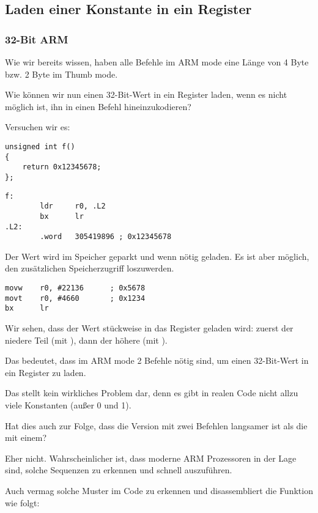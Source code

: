 \subsection{Laden einer Konstante in ein Register}
\label{ARM_big_constants}

\subsubsection{32-Bit ARM}
\label{ARM_big_constants_loading}
Wie wir bereits wissen, haben alle Befehle im ARM mode eine Länge von 4 Byte bzw. 2 Byte im Thumb mode.

Wie können wir nun einen 32-Bit-Wert in ein Register laden, wenn es nicht möglich ist, ihn in einen Befehl
hineinzukodieren?

Versuchen wir es:

\begin{lstlisting}[style=customc]
unsigned int f()
{
	return 0x12345678;
};
\end{lstlisting}

\begin{lstlisting}[caption=GCC 4.6.3 -O3 \ARMMode,style=customasmARM]
f:
        ldr     r0, .L2
        bx      lr
.L2:
        .word   305419896 ; 0x12345678
\end{lstlisting}
Der Wert  wird im Speicher geparkt und wenn nötig geladen.
Es ist aber möglich, den zusätzlichen Speicherzugriff loszuwerden.

\begin{lstlisting}[caption=GCC 4.6.3 -O3 -march{=}armv7-a (\ARMMode),style=customasmARM]
movw    r0, #22136      ; 0x5678
movt    r0, #4660       ; 0x1234
bx      lr
\end{lstlisting}
Wir sehen, dass der Wert stückweise in das Register geladen wird: zuerst der niedere Teil (mit ), dann der
höhere (mit ).

Das bedeutet, dass im ARM mode 2 Befehle nötig sind, um einen 32-Bit-Wert in ein Register zu laden.

Das stellt kein wirkliches Problem dar, denn es gibt in realen Code nicht allzu viele Konstanten (außer 0 und 1).

Hat dies auch zur Folge, dass die Version mit zwei Befehlen langsamer ist als die mit einem?

Eher nicht. Wahrscheinlicher ist, dass moderne ARM Prozessoren in der Lage sind, solche Sequenzen zu erkennen und
schnell auszuführen. 

Auch \IDA vermag solche Muster im Code zu erkennen und disassembliert die Funktion wie folgt:

